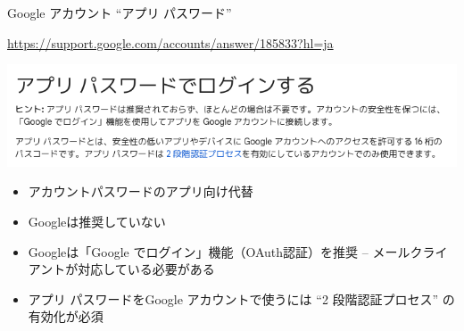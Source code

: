 \begin{frame}{Google アカウント ``アプリ パスワード''}

{\footnotesize\url{https://support.google.com/accounts/answer/185833?hl=ja}}

\begin{center}
\includegraphics[width=1\hsize]{image202205/g-support-apppass.png}
\end{center}



\begin{itemize}
 \item アカウントパスワードのアプリ向け代替
 \item Googleは推奨していない
 \item Googleは「Google でログイン」機能（OAuth認証）を推奨 -- メールクライアントが対応している必要がある
 \item アプリ パスワードをGoogle アカウントで使うには ``2 段階認証プロセス'' の有効化が必須

\end{itemize}

\end{frame}

